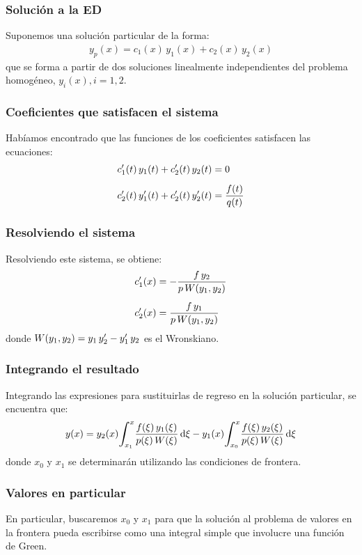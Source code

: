 \documentclass[12pt]{beamer}
\begin{document}
\begin{frame}
\frametitle{Solución a la ED}
Suponemos una solución particular de la forma:
\pause
\begin{align*}
y_{p} (x) = c_{1} (x) \, y_{1} (x) + c_{2} (x) \, y_{2} (x)
\end{align*}
que se forma a partir de dos soluciones linealmente independientes del problema homogéneo, $y_{i} (x), i = 1, 2$.
\end{frame}
\begin{frame}
\frametitle{Coeficientes que satisfacen el sistema}
Habíamos encontrado que las funciones de los coeficientes satisfacen las ecuaciones:
\pause
\begin{align}
\begin{aligned}[b]
{c}^{\prime}_{1} (t) \, y_{1} (t) + {c}^{\prime}_{2} (t) \, y_{2} (t) &= 0 \\[0.5em]
{c}^{\prime}_{2} (t) \, {y}^{\prime}_{1} (t) + {c}^{\prime}_{2} (t) \, {y}^{\prime}_{2} (t) &= \dfrac{f (t)}{q (t)}
\end{aligned}
\label{eq:ecuacion_07_26}
\end{align}
\end{frame}
\begin{frame}
\frametitle{Resolviendo el sistema}
Resolviendo este sistema, se obtiene:
\pause
\begin{align*}
{c}^{\prime}_{1} (x) &= - \dfrac{f \, y_{2}}{p \, W (y_{1}, y_{2})} \\[0.5em]
{c}^{\prime}_{2} (x) &= \dfrac{f \, y_{1}}{p \, W (y_{1}, y_{2})}
\end{align*}
donde $W (y_{1}, y_{2}) = y_{1} \, {y}^{\prime}_{2} - {y}^{\prime}_{1} \, y_{2}$ es el Wronskiano.
\end{frame}
\begin{frame}
\frametitle{Integrando el resultado}
Integrando las expresiones para sustituirlas de regreso en la solución particular, se encuentra que:
\pause
\begin{align*}
y (x) = y_{2} (x) \scaleint{6ex}_{\bs x_{1}}^{x} \dfrac{f (\xi) \, y_{1} (\xi)}{p (\xi) \, W (\xi)} \dd{\xi} - y_{1} (x) \scaleint{6ex}_{\bs x_{0}}^{x} \dfrac{f (\xi) \, y_{2} (\xi)}{p (\xi) \, W (\xi)} \dd{\xi}
\end{align*}
donde $x_{0}$ y $x_{1}$ se determinarán utilizando las condiciones de frontera.
\end{frame}
\begin{frame}
\frametitle{Valores en particular}
En particular, buscaremos $x_{0}$ y $x_{1}$ para que la solución al problema de valores en la frontera pueda escribirse como una integral simple que involucre una función de Green.
\end{frame}
\end{document}

